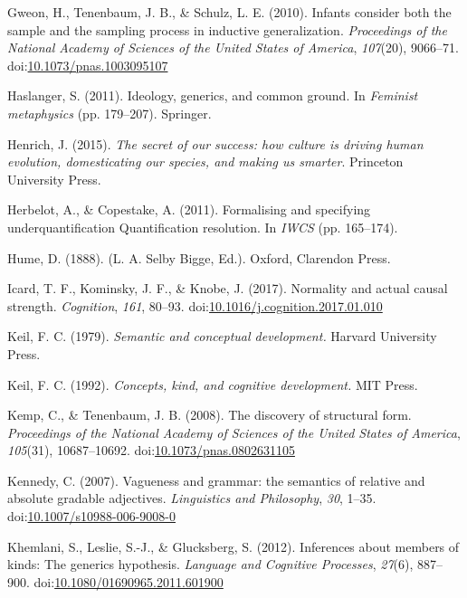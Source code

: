 \documentclass[english,floatsintext,man]{apa6}
\theoremstyle{definition}
\theoremstyle{definition}
\theoremstyle{definition}
\theoremstyle{remark}
\begin{document}
\hypertarget{ref-Gweon2010}{}
Gweon, H., Tenenbaum, J. B., \& Schulz, L. E. (2010). Infants consider
both the sample and the sampling process in inductive generalization.
\emph{Proceedings of the National Academy of Sciences of the United
States of America}, \emph{107}(20), 9066--71.
doi:\href{https://doi.org/10.1073/pnas.1003095107}{10.1073/pnas.1003095107}

\hypertarget{ref-Haslanger2011}{}
Haslanger, S. (2011). Ideology, generics, and common ground. In
\emph{Feminist metaphysics} (pp. 179--207). Springer.

\hypertarget{ref-Henrich2015}{}
Henrich, J. (2015). \emph{The secret of our success: how culture is
driving human evolution, domesticating our species, and making us
smarter}. Princeton University Press.

\hypertarget{ref-Herbelot2011}{}
Herbelot, A., \& Copestake, A. (2011). Formalising and specifying
underquantification Quantification resolution. In \emph{IWCS} (pp.
165--174).

\hypertarget{ref-HumeTHN}{}
Hume, D. (1888). (L. A. Selby Bigge, Ed.). Oxford, Clarendon Press.

\hypertarget{ref-Icard2017}{}
Icard, T. F., Kominsky, J. F., \& Knobe, J. (2017). Normality and actual
causal strength. \emph{Cognition}, \emph{161}, 80--93.
doi:\href{https://doi.org/10.1016/j.cognition.2017.01.010}{10.1016/j.cognition.2017.01.010}

\hypertarget{ref-Keil1979}{}
Keil, F. C. (1979). \emph{Semantic and conceptual development.} Harvard
University Press.

\hypertarget{ref-Keil1992}{}
Keil, F. C. (1992). \emph{Concepts, kind, and cognitive development.}
MIT Press.

\hypertarget{ref-Kemp2008}{}
Kemp, C., \& Tenenbaum, J. B. (2008). The discovery of structural form.
\emph{Proceedings of the National Academy of Sciences of the United
States of America}, \emph{105}(31), 10687--10692.
doi:\href{https://doi.org/10.1073/pnas.0802631105}{10.1073/pnas.0802631105}

\hypertarget{ref-Kennedy2007}{}
Kennedy, C. (2007). Vagueness and grammar: the semantics of relative and
absolute gradable adjectives. \emph{Linguistics and Philosophy},
\emph{30}, 1--35.
doi:\href{https://doi.org/10.1007/s10988-006-9008-0}{10.1007/s10988-006-9008-0}

\hypertarget{ref-Khemlani2012}{}
Khemlani, S., Leslie, S.-J., \& Glucksberg, S. (2012). Inferences about
members of kinds: The generics hypothesis. \emph{Language and Cognitive
Processes}, \emph{27}(6), 887--900.
doi:\href{https://doi.org/10.1080/01690965.2011.601900}{10.1080/01690965.2011.601900}
\end{document}

